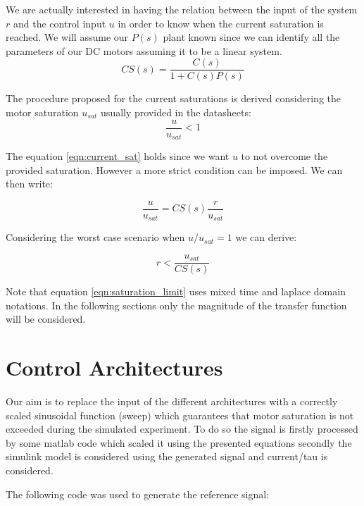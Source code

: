 \documentclass[a4paper,11pt]{article}
\begin{document}
\noindent We are actually interested in having the relation between the input of the system $r$ and the control input $u$ in order to know when the current saturation is reached. We will assume our $P(s)$ plant known since we can identify all the parameters of our DC motors assuming it to be a linear system.
\begin{equation}
  CS(s) = \frac{C(s)}{1+C(s)P(s)}
\end{equation}

\noindent The procedure proposed for the current saturations is derived considering the motor saturation $u_{sat}$ usually provided in the datasheets:
\begin{equation}
  \frac{u}{u_{sat}} < 1
  \label{eqn:current_sat}
\end{equation}

\noindent The equation \eqref{eqn:current_sat} holds since we want $u$ to not overcome the provided saturation. However a more strict condition can be imposed. We can then write:

\begin{equation}
  \frac{u}{u_{sat}} = CS(s) \frac{r}{u_{sat}}
\end{equation}

\noindent Considering the worst case scenario when $u/u_{sat}=1$ we can derive:

\begin{equation}
  r < \frac{u_{sat}}{CS(s)}
  \label{eqn:saturation_limit}
\end{equation}

\noindent Note that equation \eqref{eqn:saturation_limit} uses mixed time and laplace domain notations. In the following sections only the magnitude of the transfer function will be considered. 

\newpage
\section{Control Architectures}

Our aim is to replace the input of the different architectures with a correctly scaled sinusoidal function (sweep) which guarantees that motor saturation is not exceeded during the simulated experiment. To do so the signal is firstly processed by some matlab code which scaled it using the presented equations secondly the simulink model is considered using the generated signal and current/tau is considered. 
\bigskip

\noindent The following code was used to generate the reference signal:
\end{document}
